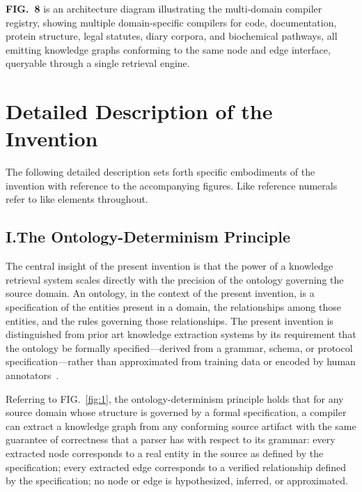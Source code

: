 \documentclass[12pt]{article}
\begin{document}
\textbf{FIG.~8} is an architecture diagram illustrating the multi-domain compiler
registry, showing multiple domain-specific compilers for code, documentation,
protein structure, legal statutes, diary corpora, and biochemical pathways, all
emitting knowledge graphs conforming to the same node and edge interface,
queryable through a single retrieval engine.

\section*{Detailed Description of the Invention}

The following detailed description sets forth specific embodiments of the
invention with reference to the accompanying figures. Like reference numerals
refer to like elements throughout.

\subsection{I.\quad The Ontology-Determinism Principle}

The central insight of the present invention is that the power of a knowledge
retrieval system scales directly with the precision of the ontology governing the
source domain. An ontology, in the context of the present invention, is a
specification of the entities present in a domain, the relationships among those
entities, and the rules governing those relationships. The present invention is
distinguished from prior art knowledge extraction systems by its requirement that
the ontology be formally specified---derived from a grammar, schema, or protocol
specification---rather than approximated from training data or encoded by human
annotators~\cite{pan2024unifyingllmkg, hogan2021knowledge}.

Referring to FIG.~\ref{fig:1}, the ontology-determinism principle holds that for
any source domain whose structure is governed by a formal specification, a
compiler can extract a knowledge graph from any conforming source artifact with
the same guarantee of correctness that a parser has with respect to its grammar:
every extracted node corresponds to a real entity in the source as defined by the
specification; every extracted edge corresponds to a verified relationship defined
by the specification; no node or edge is hypothesized, inferred, or approximated.
\end{document}
